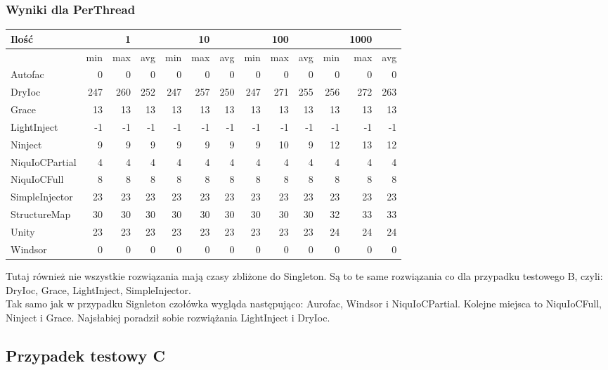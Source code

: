\documentclass[12pt]{article}
\begin{document}
\subsubsection{Wyniki dla PerThread}
\begin{center}
\begin{small}
	\begin{tabular}{ | l | r r r | r r r | r r r | r r r | }
    		\hline
     		Ilość & & 1 & & & 10 & & & 100 & & & 1000 & \\ \hline
     		 & min & max & avg & min & max & avg & min & max & avg & min & max & avg \\ \hline
    		Autofac & 0 & 0 & 0 & 0 & 0 & 0 & 0 & 0 & 0 & 0 & 0 & 0 \\ \hline
   		DryIoc & 247 & 260 & 252 & 247 & 257 & 250 & 247 & 271 & 255 & 256 & 272 & 263 \\ \hline
		Grace & 13 & 13 & 13 & 13 & 13 & 13 & 13 & 13 & 13 & 13 & 13 & 13 \\ \hline
		LightInject & -1 & -1 & -1 & -1 & -1 & -1 & -1 & -1 & -1 & -1 & -1 & -1 \\ \hline
		Ninject & 9 & 9 & 9 & 9 & 9 & 9 & 9 & 10 & 9 & 12 & 13 & 12 \\ \hline
		NiquIoCPartial & 4 & 4 & 4 & 4 & 4 & 4 & 4 & 4 & 4 & 4 & 4 & 4 \\ \hline
		NiquIoCFull & 8 & 8 & 8 & 8 & 8 & 8 & 8 & 8 & 8 & 8 & 8 & 8 \\ \hline
		SimpleInjector & 23 & 23 & 23 & 23 & 23 & 23 & 23 & 23 & 23 & 23 & 23 & 23 \\ \hline
		StructureMap & 30 & 30 & 30 & 30 & 30 & 30 & 30 & 30 & 30 & 32 & 33 & 33 \\ \hline
		Unity & 23 & 23 & 23 & 23 & 23 & 23 & 23 & 23 & 23 & 24 & 24 & 24 \\ \hline
		Windsor & 0 & 0 & 0 & 0 & 0 & 0 & 0 & 0 & 0 & 0 & 0 & 0 \\
    		\hline
  	\end{tabular}
\end{small}
\end{center}
Tutaj również nie wszystkie rozwiązania mają czasy zbliżone do Singleton. Są to te same rozwiązania co dla przypadku testowego B, czyli: DryIoc, Grace, LightInject, SimpleInjector.\\
Tak samo jak w przypadku Signleton czołówka wygląda następująco: Aurofac, Windsor i NiquIoCPartial. Kolejne miejsca to NiquIoCFull, Ninject i Grace. Najsłabiej poradził sobie rozwiążania LightInject i DryIoc.


\subsection{Przypadek testowy C}
\end{document}
